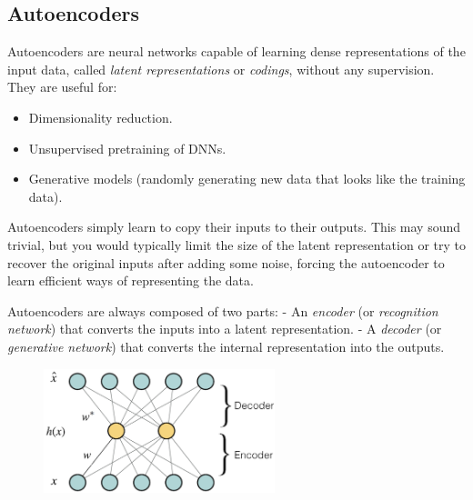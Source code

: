 \subsection{Autoencoders}

Autoencoders are neural networks capable of learning dense representations of the input data,
called \textit{latent representations} or \textit{codings}, without any supervision. They are useful for:
\vspace{-3.5mm}
\begin{itemize}
\item
Dimensionality reduction.
\item
\vspace{-2.0mm}
Unsupervised pretraining of DNNs.
\item
\vspace{-2.0mm}
Generative models (randomly generating new data that looks like the training data).
\end{itemize}

\vspace{-2.5mm}
Autoencoders simply learn to copy their inputs to their outputs.
This may sound trivial,
but you would typically limit the size of the latent representation
or try to recover the original inputs after adding some noise,
forcing the autoencoder to learn efficient ways of representing the data.

Autoencoders are always composed of two parts:\newline
- An \textit{encoder} (or \textit{recognition network}) that converts the inputs into a latent representation.\newline
- A \textit{decoder} (or \textit{generative network}) that converts the internal representation into the outputs.\newline

\begin{figure}[ht]
\centering
\includegraphics[width=0.60\textwidth]{./images/autoencoder.png}
\end{figure}

